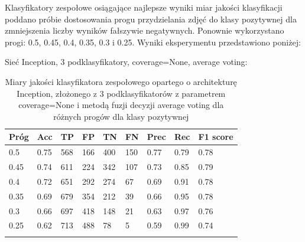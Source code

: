 \documentclass[polish,12pt]{aghthesis}
\begin{document}
\par Klasyfikatory zespołowe osiągające najlepsze wyniki miar jakości klasyfikacji poddano próbie dostosowania progu przydzielania zdjęć do klasy pozytywnej dla zmniejszenia liczby wyników fałszywie negatywnych. Ponownie wykorzystano progi: 0.5, 0.45, 0.4, 0.35, 0.3 i 0.25.
\vspace{3mm}
\newline Wyniki eksperymentu przedstawiono poniżej:
\vspace{3mm}

\par\noindent Sieć Inception, 3 podklasyfikatory, coverage=None, average voting:
\renewcommand{\arraystretch}{1.65}
 \begin{longtable}[h!]{|m{2.0cm}|m{1.2cm}|m{1.2cm}|m{1.2cm}|m{1.2cm}|m{1.2cm}|m{1.2cm}|m{1.2cm}|m{1.6cm}|}
 \hline
 Próg & Acc & TP & FP & TN & FN & Prec & Rec & F1 score\\
 \hline
 0.5 & 0.75 & 568 & 166 & 400 & 150 & 0.77 & 0.79 & 0.78\\
 \hline
 0.45 & 0.74 & 611 & 224 & 342 & 107 & 0.73 & 0.85 & 0.79\\
 \hline
 0.4 & 0.72 & 651 & 292 & 274 & 67 & 0.69 & 0.91 & 0.78\\
 \hline
 0.35 & 0.69 & 679 & 354 & 212 & 39 & 0.66 & 0.95 & 0.78\\
 \hline
 0.3 & 0.66 & 697 & 418 & 148 & 21 & 0.63 & 0.97 & 0.76\\
 \hline
 0.25 & 0.62 & 713 & 488 & 78 & 5 & 0.59 & 0.99 & 0.74\\
 \hline
\caption{Miary jakości klasyfikatora zespołowego opartego o architekturę Inception, złożonego z 3 podklasyfikatorów z parametrem coverage=None i metodą fuzji decyzji average voting dla różnych progów dla klasy pozytywnej}
\label{table:35}
\end{longtable}
\end{document}
